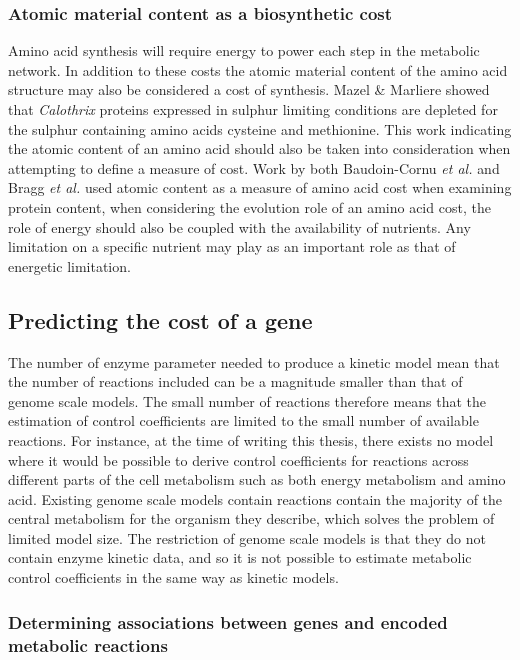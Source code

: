 \subsubsection{Atomic material content as a biosynthetic cost}

Amino acid synthesis will require energy to power each step in the metabolic network. In addition to these costs the atomic material content of the amino acid structure may also be considered a cost of synthesis. Mazel \& Marliere \cite{mazel1989} showed that \emph{Calothrix} proteins expressed in sulphur limiting conditions are depleted for the sulphur containing amino acids cysteine and methionine. This work indicating the atomic content of an amino acid should also be taken into consideration when attempting to define a measure of cost. Work by both Baudoin-Cornu \emph{et al.} \cite{baudoin2001} and Bragg \emph{et al.} \cite{bragg2006} used atomic content as a measure of amino acid cost when examining protein content, when considering the evolution role of an amino acid cost, the role of energy should also be coupled with the availability of nutrients. Any limitation on a specific nutrient may play as an important role as that of energetic limitation.

\subsection{Predicting the cost of a gene}

The number of enzyme parameter needed to produce a kinetic model mean that the number of reactions included can be a magnitude smaller than that of genome scale models. The small number of reactions therefore means that the estimation of control coefficients are limited to the small number of available reactions. For instance, at the time of writing this thesis, there exists no model where it would be possible to derive control coefficients for reactions across different parts of the cell metabolism such as both energy metabolism and amino acid. Existing genome scale models contain reactions contain the majority of the central metabolism for the organism they describe, which solves the problem of limited model size. The restriction of genome scale models is that they do not contain enzyme kinetic data, and so it is not possible to estimate metabolic control coefficients in the same way as kinetic models.

\subsubsection{Determining associations between genes and encoded metabolic reactions}

